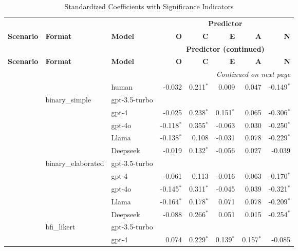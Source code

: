 \documentclass{article}
\begin{document}
\begin{longtable}{lllrrrrr}
\caption{Standardized Coefficients with Significance Indicators}
\label{tab:combined_coefficients}\\
\toprule
\multicolumn{3}{c}{} & \multicolumn{5}{c}{\textbf{Predictor}}\\
\cmidrule(l){4-8}
\textbf{Scenario} & \textbf{Format} & \textbf{Model} &
\textbf{O} & \textbf{C} & \textbf{E} & \textbf{A} & \textbf{N}\\
\midrule
\endfirsthead
\toprule
\multicolumn{3}{c}{} & \multicolumn{5}{c}{\textbf{Predictor (continued)}}\\
\cmidrule(l){4-8}
\textbf{Scenario} & \textbf{Format} & \textbf{Model} &
\textbf{O} & \textbf{C} & \textbf{E} & \textbf{A} & \textbf{N}\\
\midrule
\endhead
\midrule
\multicolumn{8}{r}{\emph{Continued on next page}}\\
\midrule
\endfoot
\bottomrule
\endlastfoot
\multirow{21}{*}{Moral} &  & human    & -0.032 & 0.211$^{*}$ & 0.009 & 0.047 & -0.149$^{*}$ \\
\addlinespace
& binary\_simple    & gpt-3.5-turbo &  &  &  &  &  \\
      &                   & gpt-4        & -0.025 & 0.238$^{*}$ & 0.151$^{*}$ & 0.065 & -0.306$^{*}$ \\
      &                   & gpt-4o       & -0.118$^{*}$ & 0.355$^{*}$ & -0.063 & 0.030 & -0.250$^{*}$ \\
      &                   & Llama        & -0.138$^{*}$ & 0.108 & -0.031 & 0.078 & -0.229$^{*}$ \\
      &                   & Deepseek     & -0.019 & 0.132$^{*}$ & -0.056 & 0.027 & -0.039 \\
\addlinespace
& binary\_elaborated & gpt-3.5-turbo &  &  &  &  &  \\
      &                   & gpt-4        & -0.061 & 0.113 & -0.016 & 0.063 & -0.170$^{*}$ \\
      &                   & gpt-4o       & -0.145$^{*}$ & 0.311$^{*}$ & -0.045 & 0.039 & -0.321$^{*}$ \\
      &                   & Llama        & -0.164$^{*}$ & 0.178$^{*}$ & 0.071 & 0.078 & -0.209$^{*}$ \\
      &                   & Deepseek     & -0.088 & 0.266$^{*}$ & 0.051 & 0.015 & -0.254$^{*}$ \\
\addlinespace
& bfi\_likert       & gpt-3.5-turbo &  &  &  &  &  \\
      &                   & gpt-4        & 0.074 & 0.229$^{*}$ & 0.139$^{*}$ & 0.157$^{*}$ & -0.085 \\

\end{longtable}
\end{document}
